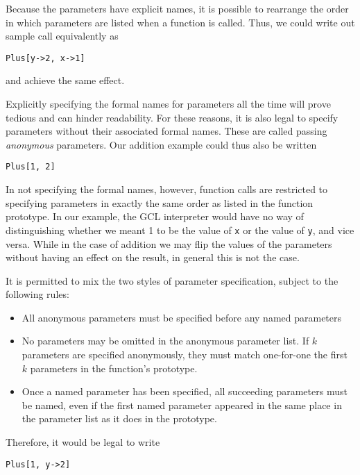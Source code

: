 Because the parameters have explicit names, it is possible to rearrange
the order in which parameters are listed when a function is called.
Thus, we could write out sample call equivalently as

\begin{verbatim}
Plus[y->2, x->1]
\end{verbatim}

\noindent and achieve the same effect.

Explicitly specifying the formal names for parameters all the time
will prove tedious and can hinder readability.  For these reasons, it is
also legal to specify parameters without their associated formal names.
These are called passing {\it anonymous} parameters.  Our addition
example could thus also be written

\begin{verbatim}
Plus[1, 2]
\end{verbatim}

In not specifying the formal names, however, function calls are restricted
to specifying parameters in exactly the same order as listed in the function
prototype.  In our example, the GCL interpreter would have no way of
distinguishing whether we meant 1 to be the value of \verb+x+ or the
value of \verb+y+, and vice versa.  While in the case of addition we may
flip the values of the parameters without having an effect on the result,
in general this is not the case.

It is permitted to mix the two styles of parameter specification, subject
to the following rules:

\begin{itemize}
\item All anonymous parameters must be specified before any named parameters
\item No parameters may be omitted in the anonymous parameter list.  If
$k$ parameters are specified anonymously, they must match one-for-one the
first $k$ parameters in the function's prototype.
\item Once a named parameter has been specified, all succeeding parameters
must be named, even if the first named parameter appeared in the same
place in the parameter list as it does in the prototype.
\end{itemize}

\noindent Therefore, it would be legal to write

\begin{verbatim}
Plus[1, y->2]
\end{verbatim}

